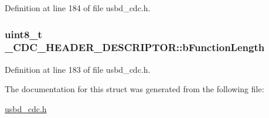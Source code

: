 Definition at line 184 of file usbd\+\_\+cdc.\+h.

\subsubsection[{\texorpdfstring{b\+Function\+Length}{bFunctionLength}}]{\setlength{\rightskip}{0pt plus 5cm}uint8\+\_\+t \+\_\+\+C\+D\+C\+\_\+\+H\+E\+A\+D\+E\+R\+\_\+\+D\+E\+S\+C\+R\+I\+P\+T\+O\+R\+::b\+Function\+Length}\hypertarget{struct__CDC__HEADER__DESCRIPTOR_a0b88951b1e043616876d35573a6d85ed}{}\label{struct__CDC__HEADER__DESCRIPTOR_a0b88951b1e043616876d35573a6d85ed}


Definition at line 183 of file usbd\+\_\+cdc.\+h.



The documentation for this struct was generated from the following file\+:\begin{DoxyCompactItemize}
\item 
\hyperlink{usbd__cdc_8h}{usbd\+\_\+cdc.\+h}\end{DoxyCompactItemize}
